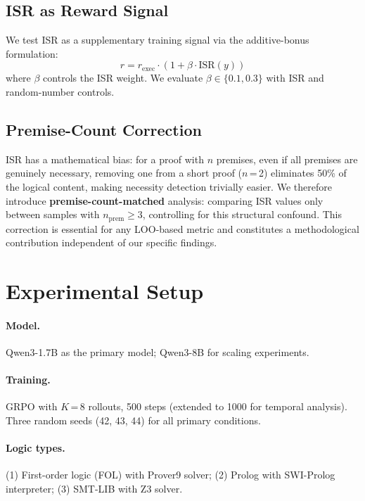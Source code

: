 \documentclass[11pt,a4paper]{article}
\begin{document}
\subsection{ISR as Reward Signal}

We test ISR as a supplementary training signal via the additive-bonus formulation:
\begin{equation}
r = r_{\text{exec}} \cdot (1 + \beta \cdot \text{ISR}(y))
\label{eq:isr_reward}
\end{equation}
where $\beta$ controls the ISR weight.
We evaluate $\beta \in \{0.1, 0.3\}$ with ISR and random-number controls.

\subsection{Premise-Count Correction}
\label{sec:premise_correction}

ISR has a mathematical bias: for a proof with $n$ premises, even if all premises are genuinely necessary, removing one from a short proof ($n$\,=\,2) eliminates 50\% of the logical content, making necessity detection trivially easier.
We therefore introduce \textbf{premise-count-matched} analysis: comparing ISR values only between samples with $n_{\text{prem}} \geq 3$, controlling for this structural confound.
This correction is essential for any LOO-based metric and constitutes a methodological contribution independent of our specific findings.

\section{Experimental Setup}
\label{sec:setup}

\paragraph{Model.}
Qwen3-1.7B as the primary model; Qwen3-8B for scaling experiments.

\paragraph{Training.}
GRPO with $K$\,=\,8 rollouts, 500 steps (extended to 1000 for temporal analysis).
Three random seeds (42, 43, 44) for all primary conditions.

\paragraph{Logic types.}
(1) First-order logic (FOL) with Prover9 solver;
(2) Prolog with SWI-Prolog interpreter;
(3) SMT-LIB with Z3 solver.
\end{document}
